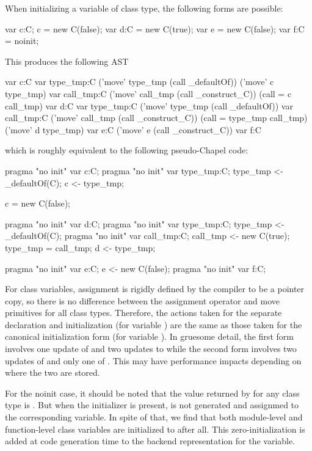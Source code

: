 When initializing a variable of class type, the following forms are possible:
\begin{chapel}
  var c:C; c = new C(false);
  var d:C = new C(true);
  var e = new C(false);
  var f:C = noinit;
\end{chapel}
This produces the following AST
\begin{chapelcode}
    var c:C
    {
      var type_tmp:C
      ('move' type_tmp (call _defaultOf))
      ('move' c type_tmp)
    }
    var call_tmp:C
    ('move' call_tmp (call _construct_C))
    (call = c call_tmp)
    var d:C
    {
      var type_tmp:C
      ('move' type_tmp (call _defaultOf))
      var call_tmp:C
      ('move' call_tmp (call _construct_C))
      (call = type_tmp call_tmp)
      ('move' d type_tmp)
    }
    var e:C
    ('move' e (call _construct_C))
    var f:C
\end{chapelcode}
which is roughly equivalent to the following pseudo-Chapel code:
\begin{chapel}
  pragma "no init" var c:C;
  pragma "no init" var type_tmp:C; type_tmp <- _defaultOf(C);
  c <- type_tmp;

  c = new C(false);

  pragma "no init" var d:C; 
  pragma "no init" var type_tmp:C; type_tmp <- _defaultOf(C);
  pragma "no init" var call_tmp:C; call_tmp <- new C(true);
  type_tmp = call_tmp;
  d <- type_tmp;

  pragma "no init" var e:C; e <- new C(false);
  pragma "no init" var f:C;
\end{chapel}

For class variables, assignment is rigidly defined by the compiler to be a pointer copy,
so there is no difference between the assignment operator and move primitives for all
class types.  Therefore, the actions taken for the separate declaration and initialization
(for variable ) are the same as those taken for the canonical initialization form
(for variable ).  In gruesome detail, the first form involves one update of
 and two updates to  while the second form involves two updates of
 and only one of .  This may have performance impacts depending on
where the two are stored.

For the noinit case, it should be noted that the value returned by  for
any class type is .  But when the  initializer is present,
 is not generated and assignmed to the corresponding variable.  In spite of
that, we find that both module-level and function-level class variables are initialized to
 after all.  This zero-initialization is added at code generation time to the
backend representation for the variable.  


